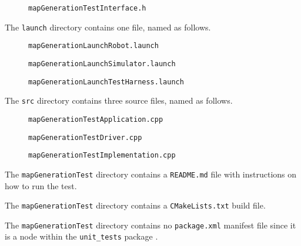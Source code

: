 \documentclass{CSSRforAfrica}
\newcommand{\checkboxChecked}{\fbox{\ding{51}}} %
\newcommand{\checkboxDashed}{\fbox{--}}         %
\begin{document}
\begin{description}
\begin{description}
\item[\checkboxChecked] {\small \verb+mapGenerationTestInterface.h+}  
\end{description} 


\item[\checkboxChecked] The  {\small \verb+launch+} directory contains one file, named as follows.
\begin{description}
\item[\checkboxDashed] {\small \verb+mapGenerationLaunchRobot.launch+}  
\item[\checkboxDashed] {\small \verb+mapGenerationLaunchSimulator.launch+}  
\item[\checkboxChecked] {\small \verb+mapGenerationLaunchTestHarness.launch+}
\end{description} 

\item[\checkboxChecked] The  {\small \verb+src+} directory contains three source files, named as follows.
\begin{description}
\item[\checkboxChecked] {\small \verb+mapGenerationTestApplication.cpp+}  
\item[\checkboxChecked] {\small \verb+mapGenerationTestDriver.cpp+}  
\item[\checkboxChecked]  {\small \verb+mapGenerationTestImplementation.cpp+}  
\end{description} 


\item[\checkboxChecked] The {\small \verb+mapGenerationTest+} directory contains  a {\small \verb+README.md+} file with  instructions on how to run the test. 
\item[\checkboxChecked] The {\small \verb+mapGenerationTest+} directory contains  a {\small \verb+CMakeLists.txt+} build file.
\item[\checkboxChecked] The {\small \verb+mapGenerationTest+} directory contains  no {\small \verb+package.xml+} manifest file since it is a node within the {\small \verb+unit_tests+} package .

\end{description}
\end{document}
